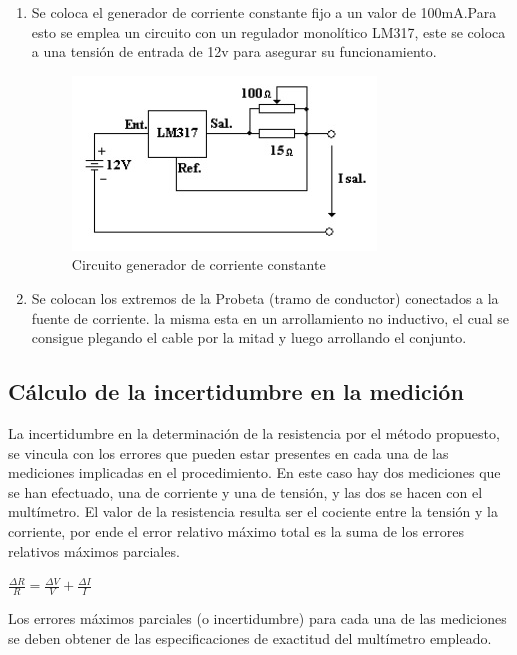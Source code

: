 \documentclass[12pt, letterpaper]{article}
\begin{document}
\begin{enumerate}
	\item Se coloca el generador de corriente constante fijo a un valor de 100mA.Para esto se emplea un circuito con un regulador monolítico
	LM317, este se coloca a una tensión de entrada de 12v para asegurar su funcionamiento.
	
	\begin{figure}[H]
		\centering
		\includegraphics{imagenes/circuito_lm317.jpg}
		\caption{Circuito generador de corriente constante}
        \label{fig.gen_corriente}
	\end{figure}

	\item Se colocan los extremos de la Probeta (tramo de conductor) conectados a la fuente de corriente. la misma esta en un 
	arrollamiento no inductivo, el cual se consigue plegando el cable por la mitad y luego arrollando el conjunto.
\end{enumerate}

\subsection{Cálculo de la incertidumbre en la medición}

La incertidumbre en la determinación de la resistencia por el método propuesto, se vincula con los 
errores que pueden estar presentes en cada una de las mediciones implicadas en el procedimiento. En 
este caso hay dos mediciones que se han efectuado, una de corriente y una de tensión, y las dos se 
hacen con el multímetro. El valor de la resistencia resulta ser el cociente entre la tensión y la 
corriente, por ende el error relativo máximo total es la suma de los errores relativos máximos parciales.
\singlespacing

  \centering
  $\frac{\Delta R}{R} = \frac{\Delta V}{V}+\frac{\Delta I}{I}$

         
   


\singlespacing
Los errores máximos parciales (o incertidumbre) para cada una de las mediciones se deben 
obtener de las especificaciones de exactitud del multímetro empleado. 
\singlespacing
\end{document}
